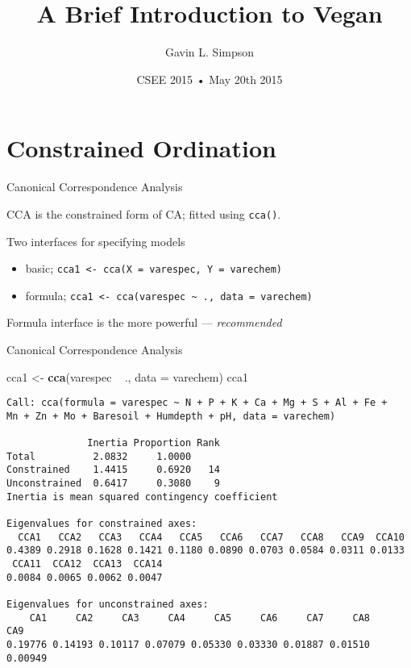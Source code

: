\documentclass[10pt,ignorenonframetext,compress, aspectratio=169]{beamer}
\title{A Brief Introduction to Vegan}
\author{Gavin L. Simpson}
\date{CSEE 2015 • May 20th 2015}
\newenvironment{Shaded}{\begin{snugshade}}{\end{snugshade}}
\newcommand{\KeywordTok}[1]{\textcolor[rgb]{0.13,0.29,0.53}{\textbf{{#1}}}}
\newcommand{\DataTypeTok}[1]{\textcolor[rgb]{0.13,0.29,0.53}{{#1}}}
\newcommand{\StringTok}[1]{\textcolor[rgb]{0.31,0.60,0.02}{{#1}}}
\newcommand{\NormalTok}[1]{{#1}}
\begin{document}
\frame{\titlepage}

\section{Constrained Ordination}\label{constrained-ordination}

\begin{frame}{Canonical Correspondence Analysis}

CCA is the constrained form of CA; fitted using \texttt{cca()}.

Two interfaces for specifying models

\begin{itemize}
\itemsep1pt\parskip0pt
\item
  basic;
  \texttt{cca1\ \textless{}-\ cca(X\ =\ varespec,\ Y\ =\ varechem)}
\item
  formula;
  \texttt{cca1\ \textless{}-\ cca(varespec\ \textasciitilde{}\ .,\ data\ =\ varechem)}
\end{itemize}

Formula interface is the more powerful --- \emph{recommended}

\end{frame}

\begin{frame}[fragile]{Canonical Correspondence Analysis}

\tiny

\begin{Shaded}
\begin{Highlighting}[]
\NormalTok{cca1 <-}\StringTok{ }\KeywordTok{cca}\NormalTok{(varespec ~}\StringTok{ }\NormalTok{., }\DataTypeTok{data =} \NormalTok{varechem)}
\NormalTok{cca1}
\end{Highlighting}
\end{Shaded}

\begin{verbatim}
Call: cca(formula = varespec ~ N + P + K + Ca + Mg + S + Al + Fe +
Mn + Zn + Mo + Baresoil + Humdepth + pH, data = varechem)

              Inertia Proportion Rank
Total          2.0832     1.0000     
Constrained    1.4415     0.6920   14
Unconstrained  0.6417     0.3080    9
Inertia is mean squared contingency coefficient 

Eigenvalues for constrained axes:
  CCA1   CCA2   CCA3   CCA4   CCA5   CCA6   CCA7   CCA8   CCA9  CCA10 
0.4389 0.2918 0.1628 0.1421 0.1180 0.0890 0.0703 0.0584 0.0311 0.0133 
 CCA11  CCA12  CCA13  CCA14 
0.0084 0.0065 0.0062 0.0047 

Eigenvalues for unconstrained axes:
    CA1     CA2     CA3     CA4     CA5     CA6     CA7     CA8     CA9 
0.19776 0.14193 0.10117 0.07079 0.05330 0.03330 0.01887 0.01510 0.00949 
\end{verbatim}

\normalsize

\end{frame}
\end{document}

